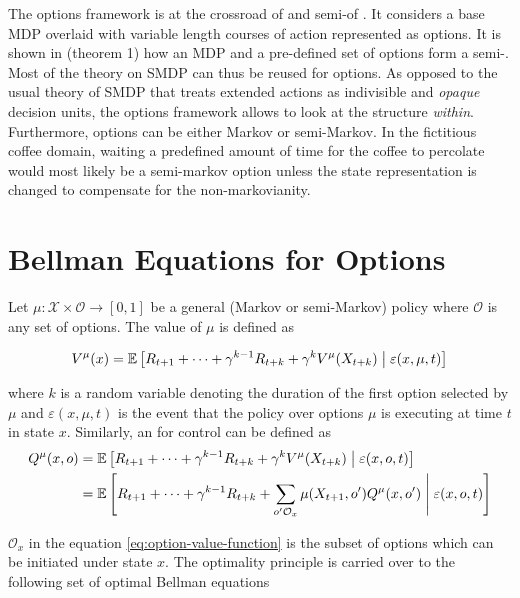 The options framework is at the crossroad of  \mdps and semi-\mdps of
\cite{Bradtke1994}. It considers a base MDP overlaid with variable length courses of
action represented as options. It is shown in \cite{Sutton1999} (theorem 1) how an
MDP and a pre-defined set of options form a semi-\mdp. Most of the theory on SMDP can
thus be reused for options. As opposed to the usual theory of SMDP that treats
extended actions as indivisible and \textit{opaque} decision units, the options
framework allows to look at the structure \textit{within}. Furthermore, options can be either Markov or semi-Markov. In the fictitious coffee domain, waiting a predefined amount of time for the coffee to percolate would most likely be a semi-markov option unless the
state representation is changed to compensate for the non-markovianity.


\section{Bellman Equations for Options}

Let $\mu : \mathcal{X} \times \mathcal{O} \to [0, 1]$  be a general (Markov or semi-Markov) policy where $\mathcal{O}$ is any set of options. The value of $\mu$ is defined as

\begin{equation}
V^\mu(x) = \operatorname{\mathbb{E}} \left[ R_{t+1} + \dots + \gamma^{k-1}R_{t+k} + \gamma^k
V^\mu(X_{t+k})  \;\middle\vert\; \varepsilon(x, \mu, t) \right]
\label{eq:value-option-policy}
\end{equation}

where $k$ is a random variable denoting the duration of the first option selected by
$\mu$ and $\varepsilon(x, \mu, t)$ is the event that the policy over options $\mu$ is
executing at time $t$ in state $x$. Similarly, an  for control can be defined as 
\begin{align}
Q^\mu(x, o) &= \operatorname{\mathbb{E}} \left[ R_{t+1} + \dots + \gamma^{k-1}R_{t+k} +
\gamma^k V^\mu(X_{t+k})  \;\middle\vert\; \varepsilon(x, o, t) \right] \notag \\
&= \operatorname{\mathbb{E}} \left[ R_{t+1} + \dots + \gamma^{k-1}R_{t+k} + \sum_{o^\prime
\mathcal{O}_x} \mu(X_{t+1}, o^\prime)Q^\mu(x, o^\prime) \;\middle\vert\; \varepsilon(x, o,
t) \right]
\label{eq:option-value-function}
\end{align}

$\mathcal{O}_x$ in the equation \ref{eq:option-value-function} is the subset of
options which can be initiated under state $x$. The optimality principle is carried over
to the following set of optimal Bellman equations

